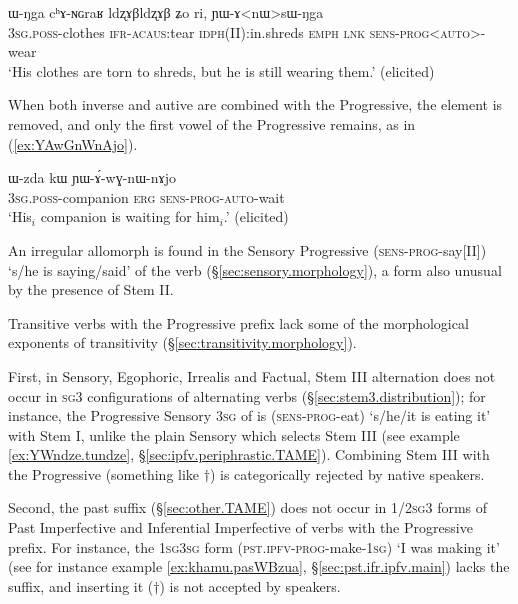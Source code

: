 \begin{exe}
\ex \label{ex:YAnWsWNga}
\gll ɯ-ŋga cʰɤ-ɴɢraʁ ldʐɤβldʐɤβ ʑo ri, ɲɯ-ɤ<nɯ>sɯ-ŋga \\
\textsc{3sg}.\textsc{poss}-clothes \textsc{ifr}-\textsc{acaus}:tear \textsc{idph}(II):in.shreds \textsc{emph} \textsc{lnk} \textsc{sens}-\textsc{prog}<\textsc{auto}>-wear \\
\glt `His clothes are torn to shreds, but he is still wearing them.' (elicited)
\end{exe}

When both inverse and autive are combined with the Progressive, the  element is removed, and only the first vowel of the Progressive remains, as in (\ref{ex:YAwGnWnAjo}).

\begin{exe}
\ex \label{ex:YAwGnWnAjo}
\gll ɯ-zda kɯ ɲɯ-ɤ́-wɣ-nɯ-nɤjo \\
\textsc{3sg}.\textsc{poss}-companion \textsc{erg} \textsc{sens}-\textsc{prog}-\textsc{auto}-wait \\
\glt `His$_i$ companion is waiting for him$_i$.' (elicited)
\end{exe} 

An irregular allomorph  is found in the Sensory Progressive  (\textsc{sens}-\textsc{prog}-say[II])  `s/he is saying/said' of the verb   (§\ref{sec:sensory.morphology}), a form also unusual by the presence of Stem II.

Transitive verbs with the Progressive prefix lack some of the morphological exponents of transitivity (§\ref{sec:transitivity.morphology}). 

First, in Sensory, Egophoric, Irrealis and Factual, Stem III alternation does not occur in \textsc{sg}\fl{}3 configurations of alternating verbs (§\ref{sec:stem3.distribution}); for instance, the Progressive Sensory \textsc{3sg}\flobv{} of  is  (\textsc{sens}-\textsc{prog}-eat) `s/he/it is eating it' with Stem I, unlike the plain Sensory  which selects Stem III (see example \ref{ex:YWndze.tundze}, §\ref{sec:ipfv.periphrastic.TAME}). Combining Stem III with the Progressive (something like $\dagger$) is categorically rejected by native speakers. 

Second, the past  suffix (§\ref{sec:other.TAME}) does not occur in 1/2\textsc{sg}\fl{}3 forms of Past Imperfective and Inferential Imperfective of verbs with the Progressive prefix. For instance, the \textsc{1sg}\fl{}\textsc{3sg} form  (\textsc{pst}.\textsc{ipfv}-\textsc{prog}-make-\textsc{1sg}) `I was making it' (see for instance example \ref{ex:khamu.pasWBzua}, §\ref{sec:pst.ifr.ipfv.main}) lacks the  suffix, and inserting it ($\dagger$) is not accepted by speakers. 

